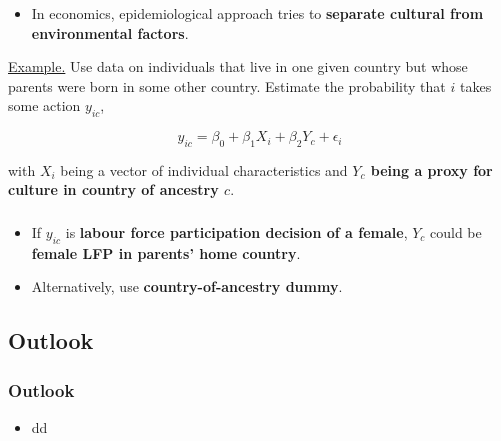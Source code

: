 \documentclass[11pt, aspectratio=1610, xcolor={dvipsnames}]{beamer}
\newcommand{\highlight}[1]{\textbf{\textcolor{PineGreen}{#1}}}
\begin{document}
	\begin{frame}
		\frametitle{}
		
		\begin{itemize}
			\item In economics, epidemiological approach tries to \highlight{separate cultural from environmental factors}.
		\end{itemize}
		
		\vspace{8mm}
		
		\begin{minipage}{\linewidth}
			\textcolor{PineGreen}{\underline{Example.}} Use data on individuals that live in one given country but whose parents were born in some other country. Estimate the probability that $i$ takes some action $y_{ic}$,
			
			\vspace{-4mm}
			
			\begin{equation}
				\label{eq:fernandez}
				y_{ic} = \beta_{0} + \beta_{1}X_{i} + \beta_{2}Y_{c} + \epsilon_{i}
			\end{equation}
			
			with $X_{i}$ being a vector of individual characteristics and \highlight{$Y_{c}$ being a proxy for culture in country of ancestry $c$}.
			
		\end{minipage}
		
	\end{frame}
	
	\begin{frame}
		\frametitle{}
		
		\begin{itemize}
			\item If $y_{ic}$ is \highlight{labour force participation decision of a female}, $Y_{c}$ could be \highlight{female LFP in parents' home country}.
			\item Alternatively, use \highlight{country-of-ancestry dummy}.
		\end{itemize}
		
	\end{frame}
	
	\subsection{Outlook}
	\begin{frame}
		\frametitle{Outlook}
		
		\begin{itemize}
			\item dd
		\end{itemize}
		
	\end{frame}
		
\end{document}
